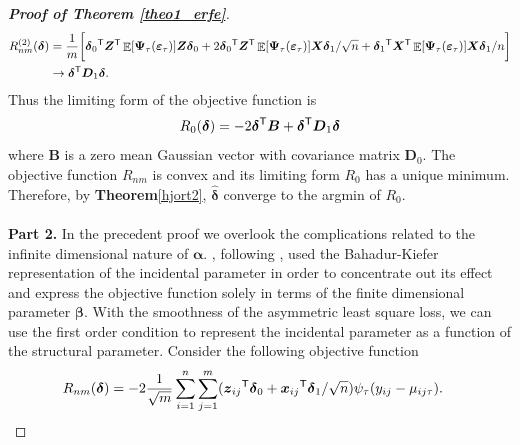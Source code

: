 \documentclass[15pt,a4paper]{article}
\DeclareMathOperator{\E}{\mathbb{E}}
\newcommand{\transpose}{{}^{\text{\sffamily T}}}
\begin{document}
\begin{proof}[\textbf{Proof of Theorem \ref{theo1_erfe}}]
\begin{equation*}
\begin{split}
    R_{nm}^{(2)}(\boldsymbol{\delta}) 
    & =  \frac{1}{m}\bigg[ \boldsymbol{\delta}_0\transpose\boldsymbol{Z}\transpose\E[\boldsymbol{\Psi}_\tau(\boldsymbol{\varepsilon}_{\tau})]\boldsymbol{Z}
    \boldsymbol{\delta}_0 + 2\boldsymbol{\delta}_0\transpose\boldsymbol{Z}\transpose\E[\boldsymbol{\Psi}_\tau(\boldsymbol{\varepsilon}_{\tau})]
    \boldsymbol{X}\boldsymbol{\delta}_1/\sqrt{n} +\boldsymbol{\delta}_1\transpose\boldsymbol{X}\transpose\E[\boldsymbol{\Psi}_\tau(\boldsymbol{\varepsilon}_{\tau})]\boldsymbol{X}
    \boldsymbol{\delta}_1/n\bigg]\\
    & \rightarrow \boldsymbol{\delta}\transpose \boldsymbol{D}_1 \boldsymbol{\delta}.
\end{split}
\end{equation*}
Thus the limiting form of the objective function is
\begin{equation*}
    R_0(\boldsymbol{\delta})=-2\boldsymbol{\delta}\transpose\boldsymbol{B}+\boldsymbol{\delta}\transpose \boldsymbol{D}_1 \boldsymbol{\delta}
\end{equation*}
where $\boldsymbol{B}$ is a zero mean Gaussian vector with covariance matrix $\boldsymbol{D}_0.$ The objective function $R_{nm}$ is convex and its limiting form $R_0$ has a unique minimum. Therefore, by \textbf{Theorem}\ref{hjort2}, $\widehat{\boldsymbol{\delta}}$ converge to the argmin of $R_0.$
~~\\
~~\\
\textbf{Part 2.} In the precedent proof we overlook the complications related to the infinite dimensional nature of $\boldsymbol{\alpha}.$ \citet{koenker_quantile_2004}, following \citep{Bickel1975,ruppert_trimmed_1980}, used the Bahadur-Kiefer representation of the incidental parameter in order to concentrate out its effect and express the objective function solely in terms of the finite dimensional parameter $\boldsymbol{\beta}.$ With the smoothness of the asymmetric least square loss, we can use the first order condition to represent the incidental parameter as a function of the structural parameter. 
\newline
\newline
Consider the following objective function
\begin{equation*}
\begin{split}
   R_{nm}(\boldsymbol{\delta})&= 
   -2\frac{1}{\sqrt{m}}\sum_{i=1}^{n}\sum_{j=1}^{m}(\boldsymbol{z}_{ij}\transpose\boldsymbol{\delta}_0
        + \boldsymbol{x}_{ij}\transpose\boldsymbol{\delta}_1/\sqrt{n})\psi_\tau(y_{ij}-\mu_{ij\tau}).

\end{split}
\end{equation*}
\end{proof}
\end{document}
